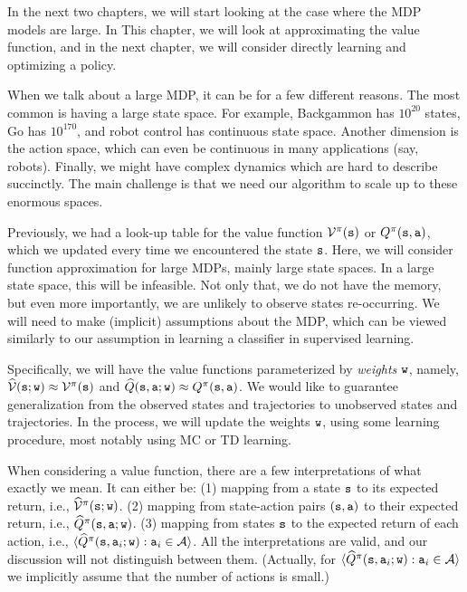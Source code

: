 In the next two chapters, we will start looking 
at the case where the MDP models are large. 
In This chapter, we will look at approximating the
value function, and in the next chapter, we will consider
directly learning and optimizing a policy.

When we talk about a large MDP, it can be for a few different
reasons. The most common is having a large state space. For example,
Backgammon has $10^{20}$ states, Go has $10^{170}$, and robot control
has continuous state space. Another dimension is the action space,
which can even be continuous in many applications (say, robots).
Finally, we might have complex dynamics which are hard to describe
succinctly. The main challenge is that we need our algorithm to
scale up to these enormous spaces.

 Previously, we had a look-up table for the value
function $\mathcal{V}^\pi({\tt s})$ or $Q^\pi({\tt s},{\tt a})$,
which we updated every time we encountered the state ${\tt s}$.
%
Here, we will consider function approximation for large MDPs, mainly
large state spaces.
%
In a large state space, this will be infeasible. Not only that, we do
not have the memory, but even more importantly, we are unlikely to
observe states re-occurring. We will need to make (implicit)
assumptions about the MDP, which can be viewed similarly to our
assumption in learning a classifier in supervised learning.

Specifically, we will have the value functions parameterized by {\em
weights} ${\tt w}$, namely, $\widehat{\mathcal{V}}({\tt s};{\tt w})\approx
\mathcal{V}^\pi({\tt s})$ and
$\widehat{Q}({\tt s},{\tt a};{\tt w})\approx
Q^\pi({\tt s},{\tt a})$. We would like to guarantee
generalization from the observed states and trajectories to
unobserved states and trajectories. In the process, we will update
the weights ${\tt w}$, using some learning procedure, most notably
using MC or TD learning.

When considering a value function, there are a few interpretations
of what exactly we mean. It can either be: (1) mapping from a state
${\tt s}$ to its expected return, i.e.,
$\widehat{\mathcal{V}}^\pi({\tt s};{\tt w})$. (2) mapping from state-action
pairs $({\tt s},{\tt a})$ to their expected return, i.e.,
$\widehat{Q}^\pi({\tt s},{\tt a};{\tt w})$. (3) mapping from
states ${\tt s}$ to the expected return of each action, i.e.,
$\langle\widehat{Q}^\pi({\tt s},{\tt a}_i;{\tt w}):{\tt a}_i\in
\mathcal{A}\rangle$. All the interpretations are valid, and our
discussion will not distinguish between them. (Actually, for
$\langle\widehat{Q}^\pi({\tt s},{\tt a}_i;{\tt w}):{\tt a}_i\in
\mathcal{A}\rangle$ we implicitly assume that the number of actions is
small.)

